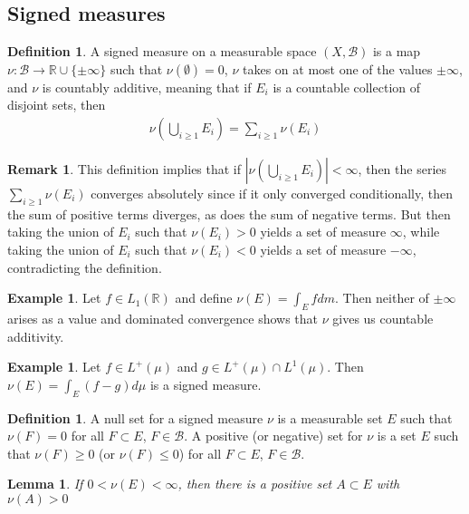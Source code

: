 \documentclass[11pt]{amsart}
\newtheorem{lemma}[theorem]{Lemma}
\theoremstyle{definition}
\newtheorem{definition}[theorem]{Definition}
\newtheorem{remark}[theorem]{Remark}
\newtheorem{example}[theorem]{Example}
\numberwithin{equation}{section}
\begin{document}
\subsection{Signed measures}
\begin{definition}
    A signed measure on a measurable space $(X,\mathcal B)$ is a map $\nu:\mathcal B\to\mathbb R\cup\{\pm\infty\}$ such that $\nu(\emptyset)=0$, $\nu$ takes on at most one of the values $\pm \infty$, and $\nu$ is countably additive, meaning that if $E_i$ is a countable collection of disjoint sets, then
    \begin{align*}
        \nu(\bigcup_{i\ge 1}E_i)=\sum_{i\ge 1}\nu(E_i)
    \end{align*}
\end{definition}
\begin{remark}
    This definition implies that if $|\nu(\bigcup_{i\ge 1}E_i)|<\infty$, then the series $\sum_{i\ge 1}\nu(E_i)$ converges absolutely since if it only converged conditionally, then the sum of positive terms diverges, as does the sum of negative terms. But then taking the union of $E_i$ such that $\nu(E_i)>0$ yields a set of measure $\infty$, while taking the union of $E_i$ such that $\nu(E_i)<0$ yields a set of measure $-\infty$, contradicting the definition.
\end{remark}
\begin{example}
    Let $f\in L_1(\mathbb R)$ and define $\nu(E)=\int_Efdm$. Then neither of $\pm\infty$ arises as a value and dominated convergence shows that $\nu$ gives us countable additivity.
\end{example}
\begin{example}
    Let $f\in L^+(\mu)$ and $g\in L^+(\mu)\cap L^1(\mu)$. Then $\nu(E)=\int_E(f-g)d\mu$ is a signed measure.
\end{example}
\begin{definition}
    A null set for a signed measure $\nu$ is a measurable set $E$ such that $\nu(F)=0$ for all $F\subset E$, $F\in\mathcal B$. A positive (or negative) set for $\nu$ is a set $E$ such that $\nu(F)\ge 0$ (or $\nu(F)\le 0$) for all $F\subset E$, $F\in\mathcal B$.
\end{definition}
\begin{lemma}
    If $0<\nu(E)<\infty$, then there is a positive set $A\subset E$ with $\nu(A)>0$
\end{lemma}
\end{document}
